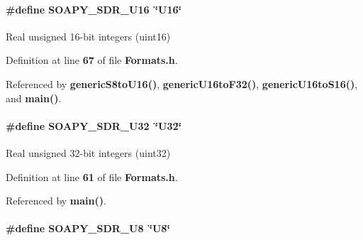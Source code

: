 \paragraph[{S\+O\+A\+P\+Y\+\_\+\+S\+D\+R\+\_\+\+U16}]{\setlength{\rightskip}{0pt plus 5cm}\#define S\+O\+A\+P\+Y\+\_\+\+S\+D\+R\+\_\+\+U16~\char`\"{}U16\char`\"{}}\label{Formats_8h_a2298a2edd13a4a1d2ba99288e937680a}


Real unsigned 16-\/bit integers (uint16) 



Definition at line {\bf 67} of file {\bf Formats.\+h}.



Referenced by {\bf generic\+S8to\+U16()}, {\bf generic\+U16to\+F32()}, {\bf generic\+U16to\+S16()}, and {\bf main()}.

\paragraph[{S\+O\+A\+P\+Y\+\_\+\+S\+D\+R\+\_\+\+U32}]{\setlength{\rightskip}{0pt plus 5cm}\#define S\+O\+A\+P\+Y\+\_\+\+S\+D\+R\+\_\+\+U32~\char`\"{}U32\char`\"{}}\label{Formats_8h_a5a7d56384e6600e0a6d99806fc398f6e}


Real unsigned 32-\/bit integers (uint32) 



Definition at line {\bf 61} of file {\bf Formats.\+h}.



Referenced by {\bf main()}.

\paragraph[{S\+O\+A\+P\+Y\+\_\+\+S\+D\+R\+\_\+\+U8}]{\setlength{\rightskip}{0pt plus 5cm}\#define S\+O\+A\+P\+Y\+\_\+\+S\+D\+R\+\_\+\+U8~\char`\"{}U8\char`\"{}}\label{Formats_8h_a030edac0fb176061facec9eee151a775}


